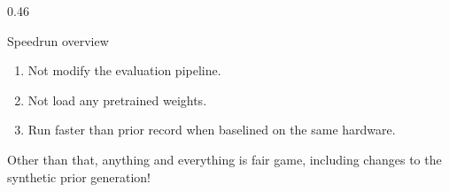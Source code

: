 \documentclass[final]{beamer}
\begin{document}
\begin{frame}[t]
\begin{columns}[t]
\begin{column}{0.46\paperwidth}
\begin{block}{Speedrun overview}

    \begin{enumerate}
      \item Not modify the evaluation pipeline.
      \item Not load any pretrained weights.
      \item Run faster than prior record when baselined on the same hardware.
    \end{enumerate}

    Other than that, anything and everything is fair game, including changes to the synthetic prior generation!

    \vspace{0.7em}



\end{block}
\end{column}
\end{columns}
\end{frame}
\end{document}
